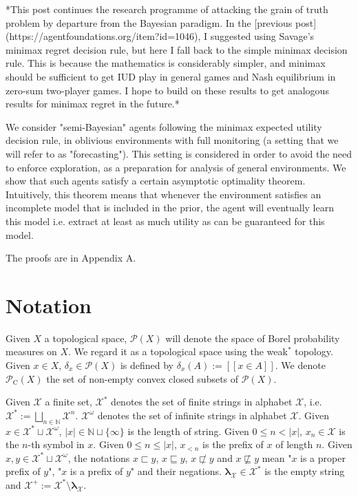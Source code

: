 \documentclass[a4paper]{article}
\newcommand{\Nats}{\mathbb{N}}
\newcommand{\Estr}{\bm{\lambda}}
\newcommand{\Abs}[1]{\lvert #1 \rvert}
\newcommand{\Prob}{\mathcal{P}}
\newcommand{\CC}{\mathcal{P}_{\operatorname{C}}}
\begin{document}
*This post continues the research programme of attacking the grain of truth problem by departure from the Bayesian paradigm. In the [previous post](https://agentfoundations.org/item?id=1046), I suggested using Savage's minimax regret decision rule, but here I fall back to the simple minimax decision rule. This is because the mathematics is considerably simpler, and minimax should be sufficient to get IUD play in general games and Nash equilibrium in zero-sum two-player games. I hope to build on these results to get analogous results for minimax regret in the future.*

We consider "semi-Bayesian" agents following the minimax expected utility decision rule, in oblivious environments with full monitoring (a setting that we will refer to as "forecasting"). This setting is considered in order to avoid the need to enforce exploration, as a preparation for analysis of general environments. We show that such agents satisfy a certain asymptotic optimality theorem. Intuitively, this theorem means that whenever the environment satisfies an incomplete model that is included in the prior, the agent will eventually learn this model i.e. extract at least as much utility as can be guaranteed for this model.

The proofs are in Appendix A.

\section{Notation}

Given ${X}$ a topological space, ${\Prob(X)}$ will denote the space of Borel probability measures on ${X}$. We regard it as a topological space using the weak${^*}$ topology. Given ${x \in X}$, ${\delta_x \in \Prob(X)}$ is defined by ${\delta_x(A):=[[x \in A]]}$. We denote ${\CC(X)}$ the set of non-empty convex closed subsets of ${\Prob(X)}$.

Given ${\mathcal{X}}$ a finite set, ${\mathcal{X}^*}$ denotes the set of finite strings in alphabet ${\mathcal{X}}$, i.e. ${\mathcal{X}^*:=\bigsqcup_{n \in \Nats} \mathcal{X}^n}$. ${\mathcal{X}^\omega}$ denotes the set of infinite strings in alphabet ${\mathcal{X}}$. Given ${x \in \mathcal{X}^* \sqcup \mathcal{X}^\omega}$, ${\Abs{x} \in \Nats \sqcup \{\infty\}}$ is the length of string. Given ${0 \leq n < \Abs{x}}$, ${x_n \in \mathcal{X}}$ is the ${n}$-th symbol in ${x}$. Given ${0 \leq n \leq \Abs{x}}$, ${x_{<n}}$ is the prefix of ${x}$ of length ${n}$. Given ${x,y \in \mathcal{X}^* \sqcup \mathcal{X}^\omega}$, the notations ${x \sqsubset y}$, ${x \sqsubseteq y}$, ${x \not\sqsubset y}$ and ${x \not\sqsubseteq y}$ mean "${x}$ is a proper prefix of ${y}$", "${x}$ is a prefix of ${y}$" and their negations. ${\Estr_\mathcal{X} \in \mathcal{X}^*}$ is the empty string and ${\mathcal{X}^{+}:=\mathcal{X}^* \setminus \Estr_\mathcal{X}}$. 
\end{document}
